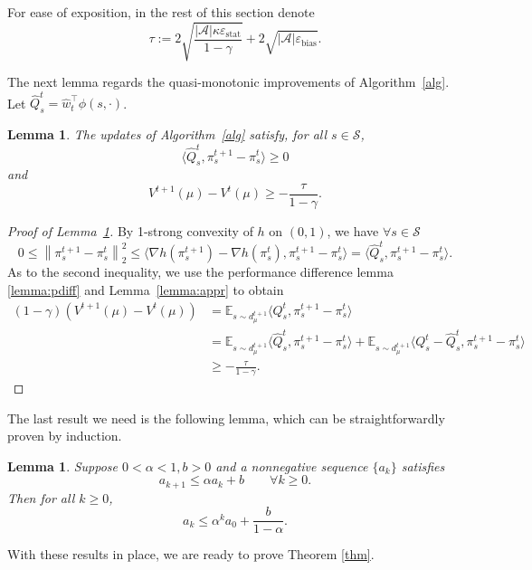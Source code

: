 \documentclass[a4paper,12pt]{article}
\newtheorem{lemma}[theorem]{Lemma}
\numberwithin{theorem}{section}
\newcommand\E{\mathbb{E}}
\newcommand\A{\mathcal{A}}
\renewcommand\S{\mathcal{S}}
\newcommand\1{\mathbf{1}}
\newcommand{\norm}[1]{\left\lVert #1 \right\rVert}
\begin{document}
For ease of exposition, in the rest of this section denote
\[\tau:=2\sqrt{\frac{|\A|\kappa\varepsilon_\text{stat}}{1-\gamma}}+ 2\sqrt{|\A|\varepsilon_\text{bias}}.\]

The next lemma regards the quasi-monotonic improvements of Algorithm~\ref{alg}. Let $\widehat{Q}^t_s = \widehat{w}_t^\top\phi(s,\cdot)$.
\begin{lemma}
	\label{lemma:2}
    The updates of Algorithm~\ref{alg} satisfy, for all $s\in\S$,
	\[\langle \widehat{Q}^t_s,\pi^{t+1}_s-\pi^t_s\rangle\geq 0\]
	and
	\begin{equation*}
		V^{t+1}(\mu)-V^t(\mu)\geq -\frac{\tau}{1-\gamma}.
	\end{equation*}
\end{lemma}
\begin{proof}[Proof of Lemma~\ref{lemma:2}]
    By 1-strong convexity of $h$ on $(0,1)$, we have $\forall s\in\S$
	\[0\leq\norm{\pi^{t+1}_s - \pi^t_s}_2^2\leq\langle \nabla h(\pi^{t+1}_s) - \nabla h(\pi^t_s),\pi^{t+1}_s - \pi^t_s\rangle = \langle \widehat{Q}^t_s,\pi^{t+1}_s - \pi^t_s \rangle.\]
	As to the second inequality, we use the performance difference lemma \eqref{lemma:pdiff} and Lemma~\ref{lemma:appr} to obtain
	\begin{align*}
		(1-\gamma)(V^{t+1}(\mu)-V^t(\mu))&=\E_{s\sim d_\mu^{t+1}}\langle Q_s^t,\pi^{t+1}_s-\pi_s^t\rangle\\
		&=\E_{s\sim d_\mu^{t+1}}\langle \widehat{Q}_s^t,\pi^{t+1}_s-\pi_s^t\rangle + \E_{s\sim d_\mu^{t+1}}\langle Q_s^t-\widehat{Q}_s^t,\pi^{t+1}_s-\pi_s^t\rangle\\
		&\geq -\frac{\tau}{1-\gamma}.
	\end{align*}
\end{proof}

The last result we need is the following lemma, which can be straightforwardly proven by induction. 
\begin{lemma}
	\label{lemma:rec}
	Suppose $0<\alpha<1, b>0$ and a nonnegative sequence $\{a_k\}$ satisfies \[a_{k+1}\leq\alpha a_k + b\qquad\forall k\geq 0.\] Then for all $k\geq 0$,\[a_k\leq\alpha^k a_0+\frac{b}{1-\alpha}.\]
\end{lemma}

With these results in place, we are ready to prove Theorem \ref{thm}.
\end{document}
